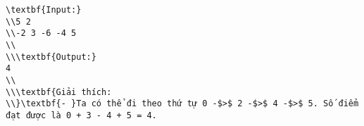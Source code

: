 \begin{verbatim}
\textbf{Input:}
\\5 2
\\-2 3 -6 -4 5
\\
\\\textbf{Output:}
4
\\
\\\textbf{Giải thích:
\\}\textbf{- }Ta có thể đi theo thứ tự 0 -$>$ 2 -$>$ 4 -$>$ 5. Số điểm đạt được là 0 + 3 - 4 + 5 = 4.\end{verbatim}